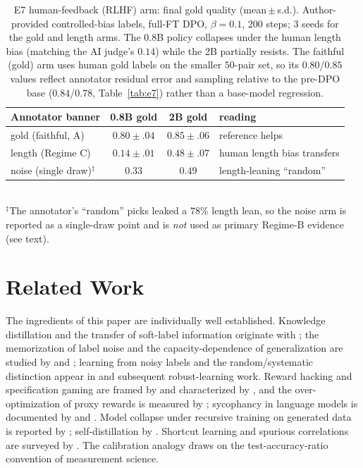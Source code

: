 \documentclass[10pt]{article} %
\theoremstyle{plain}
\theoremstyle{remark}
\begin{document}
\begin{table}[t]
\centering\small
\caption{E7 human-feedback (RLHF) arm: final gold quality (mean\,$\pm$\,s.d.). Author-provided controlled-bias labels, full-FT DPO, $\beta=0.1$, $200$ steps; $3$ seeds for the gold and length arms. The 0.8B policy collapses under the human length bias (matching the AI judge's $0.14$) while the 2B partially resists. The faithful (gold) arm uses human gold labels on the smaller $50$-pair set, so its $0.80$/$0.85$ values reflect annotator residual error and sampling relative to the pre-DPO base ($0.84$/$0.78$, Table~\ref{tab:e7}) rather than a base-model regression.}
\label{tab:e7-rlhf}
\begin{tabular}{lccl}
\hline
Annotator banner & 0.8B gold & 2B gold & reading \\
\hline
gold (faithful, A) & $0.80\pm.04$ & $0.85\pm.06$ & reference helps \\
length (Regime C) & $0.14\pm.01$ & $0.48\pm.07$ & human length bias transfers \\
noise (single draw)$^{\ddagger}$ & $0.33$ & $0.49$ & length-leaning ``random'' \\
\hline
\end{tabular}\\[3pt]
{\footnotesize $^{\ddagger}$The annotator's ``random'' picks leaked a $78\%$ length lean, so the noise arm is reported as a single-draw point and is \emph{not} used as primary Regime-B evidence (see text).}
\end{table}

\section{Related Work}
\label{sec:related}

The ingredients of this paper are individually well established. Knowledge distillation and the transfer of soft-label information originate with \citet{hinton2015}; the memorization of label noise and the capacity-dependence of generalization are studied by \citet{zhang2017} and \citet{arpit2017}; learning from noisy labels and the random/systematic distinction appear in \citet{natarajan2013} and subsequent robust-learning work. Reward hacking and specification gaming are framed by \citet{amodei2016} and characterized by \citet{skalse2022}, and the over-optimization of proxy rewards is measured by \citet{gao2023}; sycophancy in language models is documented by \citet{perez2022} and \citet{sharma2023}. Model collapse under recursive training on generated data is reported by \citet{shumailov2024}; self-distillation by \citet{furlanello2018}. Shortcut learning and spurious correlations are surveyed by \citet{geirhos2020}. The calibration analogy draws on the test-accuracy-ratio convention of measurement science.
\end{document}
